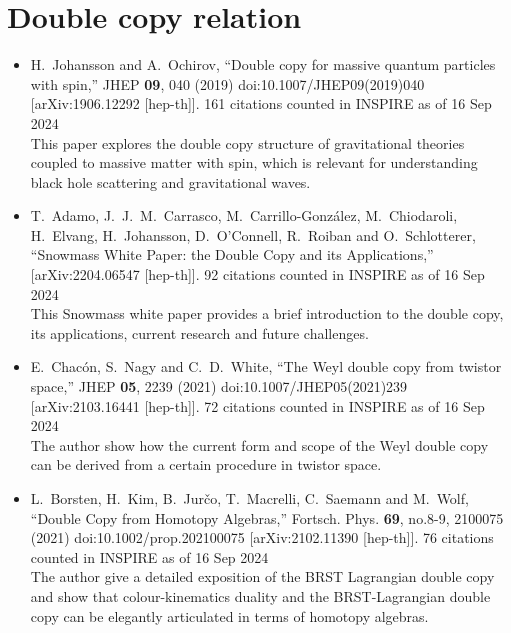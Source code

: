 \documentclass[a4paper,12pt]{article}
\begin{document}
\section*{Double copy relation}
\begin{itemize}
    \item %
    H.~Johansson and A.~Ochirov,
    ``Double copy for massive quantum particles with spin,''
    JHEP \textbf{09}, 040 (2019)
    doi:10.1007/JHEP09(2019)040
    [arXiv:1906.12292 [hep-th]].
    161 citations counted in INSPIRE as of 16 Sep 2024\\
    This paper explores the double copy structure of gravitational theories coupled to massive matter with spin, which is relevant for understanding black hole scattering and gravitational waves.
    \item %
    T.~Adamo, J.~J.~M.~Carrasco, M.~Carrillo-Gonz\'alez, M.~Chiodaroli, H.~Elvang, H.~Johansson, D.~O'Connell, R.~Roiban and O.~Schlotterer,
    ``Snowmass White Paper: the Double Copy and its Applications,''
    [arXiv:2204.06547 [hep-th]].
    92 citations counted in INSPIRE as of 16 Sep 2024\\
    This Snowmass white paper provides a brief introduction to the double copy, its applications,
    current research and future challenges.
    \item %
    E.~Chac\'on, S.~Nagy and C.~D.~White,
    ``The Weyl double copy from twistor space,''
    JHEP \textbf{05}, 2239 (2021)
    doi:10.1007/JHEP05(2021)239
    [arXiv:2103.16441 [hep-th]].
    72 citations counted in INSPIRE as of 16 Sep 2024\\
    The author show how
    the current form and scope of the Weyl double copy can be derived from a certain procedure
    in twistor space.
    \item %
    L.~Borsten, H.~Kim, B.~Jur\v{c}o, T.~Macrelli, C.~Saemann and M.~Wolf,
    ``Double Copy from Homotopy Algebras,''
    Fortsch. Phys. \textbf{69}, no.8-9, 2100075 (2021)
    doi:10.1002/prop.202100075
    [arXiv:2102.11390 [hep-th]].
    76 citations counted in INSPIRE as of 16 Sep 2024\\
    The author give a detailed exposition of the BRST Lagrangian double copy and show that colour-kinematics duality and the BRST-Lagrangian double copy can be
 elegantly articulated in terms of homotopy algebras.
\end{itemize}
\end{document}
